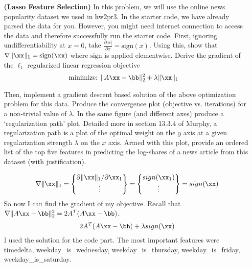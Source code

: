 \documentclass[12pt,letterpaper,boxed]{hmcpset}
\begin{document}
\begin{problem}[2]
\textbf{(Lasso Feature Selection)} 
In this problem, we will use the online news popularity dataset we used in hw2pr3. In the starter code, we have already parsed the data for you. However, you might need internet connection to access the data and therefore successfully run the starter code.
\newline
\newline
First, ignoring undifferentiability at $x=0$, take $\frac{\partial |x|}{\partial x}
= \mathrm{sign} (x)$. Using this, show that $\nabla \|\xx\|_1 = \mathrm{sign}(\xx)$ where $\mathrm{sign}$ is applied
elementwise. Derive the gradient of the $\ell_1$ regularized linear regression objective
\begin{align*}
    \text{minimize: } & \|A\xx - \bb\|_2^2 + \lambda \|\xx\|_1
\end{align*}

Then, implement a gradient descent based solution of the above optimization problem for this data. Produce
the convergence plot (objective vs. iterations) for a non-trivial value of $\lambda$.
In the same figure (and different axes) produce a `regularization path' plot. Detailed
more in section 13.3.4 of Murphy, a regularization path is a plot of the optimal weight on
the $y$ axis at a given regularization strength $\lambda$ on the $x$ axis. Armed with this
plot, provide an ordered list of the top five features in predicting the log-shares of a news
article from this dataset (with justification).
\end{problem}
\begin{solution}
  \begin{align*}
    \nabla \|\xx\|_1 =
    \begin{Bmatrix}
      \partial \|\xx\|_1 / \partial \xx_1 \\ \vdots 
    \end{Bmatrix} =
    \begin{Bmatrix}
      sign(\xx_1) \\ \vdots
    \end{Bmatrix}
    = sign(\xx)
  \end{align*}
  So now I can find the gradient of my objective. Recall that $\nabla \|A\xx - \bb
  \|_2^2 = 2A^T(A\xx-\bb)$.
  \begin{align*}
    2A^T(A\xx - \bb) + \lambda sign(\xx)
  \end{align*}
  I used the solution for the code part.
  The most important features were timedelta, weekday\_is\_wednesday, weekday\_is\_thursday,
 weekday\_is\_friday, weekday\_is\_saturday.
\end{solution}
\end{document}

